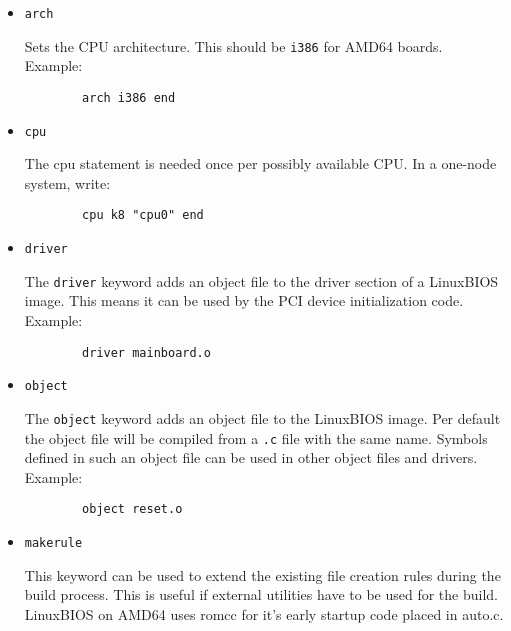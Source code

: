 \documentclass[titlepage,12pt]{article}
\begin{document}
\begin{itemize}
\item \begin{verbatim}arch\end{verbatim}

Sets the CPU architecture. This should be \texttt{i386} for AMD64 boards.\\
Example:

\begin{verbatim}
        arch i386 end
\end{verbatim}

\item \begin{verbatim}cpu\end{verbatim}

The cpu statement is needed once per possibly available CPU. In a
one-node system, write:

\begin{verbatim}
        cpu k8 "cpu0" end
\end{verbatim}

\item \begin{verbatim}driver\end{verbatim}

The \texttt{driver} keyword adds an object file to the driver section of a
LinuxBIOS image.  This means it can be used by the PCI device
initialization code. Example:

\begin{verbatim}
        driver mainboard.o
\end{verbatim}

\item \begin{verbatim}object\end{verbatim}

The \texttt{object} keyword adds an object file to the LinuxBIOS image.
Per default the object file will be compiled from a \texttt{.c} file
with the same name. Symbols defined in such an object file can be used
in other object files and drivers. Example:

\begin{verbatim}
        object reset.o
\end{verbatim}

\item \begin{verbatim}makerule\end{verbatim}

This keyword can be used to extend the existing file creation rules
during the build process. This is useful if external utilities have to
be used for the build. LinuxBIOS on AMD64 uses romcc for it's early
startup code placed in auto.c.


\end{itemize}
\end{document}
